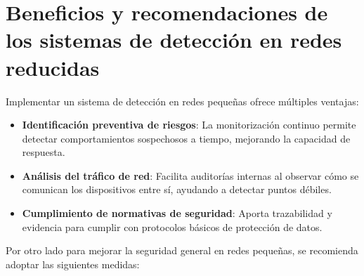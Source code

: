 \documentclass[11pt,a4paper,twoside]{report}
\begin{document}




\section{Beneficios y recomendaciones de los sistemas de detección en redes reducidas}

Implementar un sistema de detección en redes pequeñas ofrece múltiples ventajas:

\begin{itemize}
	\item \textbf{Identificación preventiva de riesgos}: La monitorización continuo permite detectar comportamientos sospechosos a tiempo, mejorando la capacidad de respuesta.
	\item \textbf{Análisis del tráfico de red}: Facilita auditorías internas al observar cómo se comunican los dispositivos entre sí, ayudando a detectar puntos débiles.
	\item \textbf{Cumplimiento de normativas de seguridad}: Aporta trazabilidad y evidencia para cumplir con protocolos básicos de protección de datos.
\end{itemize}


Por otro lado para mejorar la seguridad general en redes pequeñas, se recomienda adoptar las siguientes medidas:
\end{document}
